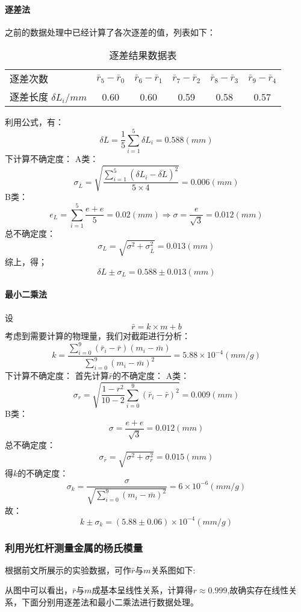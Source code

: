 \documentclass{ctexart}
\begin{document}
\paragraph{逐差法}之前的数据处理中已经计算了各次逐差的值，列表如下：
\begin{table}[H]
  \centering
  \caption{逐差结果数据表}
    \begin{tabular}{lccccc}
    逐差次数  & \multicolumn{1}{l}{$\bar{r}_5-\bar{r}_0$} & \multicolumn{1}{l}{$\bar{r}_6-\bar{r}_1$} & \multicolumn{1}{l}{$\bar{r}_7-\bar{r}_2$} & \multicolumn{1}{l}{$\bar{r}_8-\bar{r}_3$} & \multicolumn{1}{l}{$\bar{r}_9-\bar{r}_4$} \\
    逐差长度 $\delta L_i/mm$ & 0.60  & 0.60  & 0.59  & 0.58  & 0.57  \\
    \end{tabular}%
  \label{tab:addlabel}%
\end{table}%
利用公式，有：
$$\delta L=\frac{1}5 \sum_{i=1}^5{\delta L_i}=0.588(mm)$$
下计算不确定度：
A类：$$\sigma_{\bar{L}}=\sqrt{\frac{\sum\limits_{i=1}^5{(\delta L_i-\overline{\delta L})^2}}{5\times4}}=0.006(mm)$$
B类：$$e_L=\sum\limits_{i=1}^5{\frac{e+e}5}=0.02(mm)\Rightarrow \sigma=\frac{e}{\sqrt{3}}=0.012(mm)$$
总不确定度：$$\sigma_L=\sqrt{\sigma^2+\sigma_{\bar{L}}^2}=0.013(mm)$$
综上，得；$$\delta L\pm \sigma_L=0.588\pm 0.013(mm)$$
\paragraph{最小二乘法}
设$$\bar{r}=k\times m+b$$
考虑到需要计算的物理量，我们对截距进行分析：
$$k=\frac{\sum\limits_{i=0}^9{(\bar{r}_i-\bar{r})(m_i-\bar{m})}}{\sum\limits_{i=0}^9{(m_i-\bar{m})^2}}=5.88\times 10^{-4}(mm/g)$$
下计算不确定度：
首先计算$\bar{r}$的不确定度：
A类：$$\sigma_r =\sqrt{\frac{1-r^2}{10-2}\sum\limits_{i=0}^9{(\bar{r}_i-\bar{r})^2}}=0.009(mm)$$
B类：$$\sigma=\frac{e+e}{\sqrt{3}}=0.012(mm)$$
总不确定度：$$\sigma_{\bar{r}}=\sqrt{\sigma^2+\sigma_r^2}=0.015(mm)$$
得$k$的不确定度：
$$\sigma_k=\frac{\sigma}{\sqrt{\sum\limits_{i=0}^9{(m_i-\bar{m})^2}}}=6\times10^{-6}(mm/g)$$
故：
$$k\pm \sigma_k=(5.88\pm 0.06  )\times 10^{-4}(mm/g)$$
\subsubsection{利用光杠杆测量金属的杨氏模量}
根据前文所展示的实验数据，可作$\bar{r}$与$m$关系图如下:

从图中可以看出，$\bar{r}$与$m$成基本呈线性关系，计算得$r\approx 0.999$,故确实存在线性关系，下面分别用逐差法和最小二乘法进行数据处理。
\end{document}
